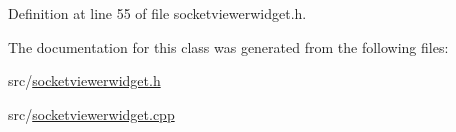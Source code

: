 Definition at line 55 of file socketviewerwidget.\+h.



The documentation for this class was generated from the following files\+:\begin{DoxyCompactItemize}
\item 
src/\mbox{\hyperlink{socketviewerwidget_8h}{socketviewerwidget.\+h}}\item 
src/\mbox{\hyperlink{socketviewerwidget_8cpp}{socketviewerwidget.\+cpp}}\end{DoxyCompactItemize}
